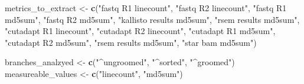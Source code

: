 \documentclass[]{article}
\newenvironment{Shaded}{\begin{snugshade}}{\end{snugshade}}
\newcommand{\KeywordTok}[1]{\textcolor[rgb]{0.13,0.29,0.53}{\textbf{#1}}}
\newcommand{\NormalTok}[1]{#1}
\newcommand{\StringTok}[1]{\textcolor[rgb]{0.31,0.60,0.02}{#1}}
\begin{document}
\begin{Shaded}
\begin{Highlighting}[]
\NormalTok{metrics_to_extract <-}\StringTok{ }\KeywordTok{c}\NormalTok{(}\StringTok{"fastq R1 linecount"}\NormalTok{, }
  \StringTok{"fastq R2 linecount"}\NormalTok{,}
  \StringTok{"fastq R1 md5sum"}\NormalTok{, }
  \StringTok{"fastq R2 md5sum"}\NormalTok{, }
  \StringTok{"kallisto results md5sum"}\NormalTok{,}
  \StringTok{"rsem results md5sum"}\NormalTok{,}
  \StringTok{"cutadapt R1 linecount"}\NormalTok{,}
  \StringTok{"cutadapt R2 linecount"}\NormalTok{,}
  \StringTok{"cutadapt R1 md5sum"}\NormalTok{,}
  \StringTok{"cutadapt R2 md5sum"}\NormalTok{,}
  \StringTok{"rsem results md5sum"}\NormalTok{,}
  \StringTok{"star bam md5sum"}\NormalTok{)}

\NormalTok{branches_analzyed <-}\StringTok{  }\KeywordTok{c}\NormalTok{(}\StringTok{"^ungroomed"}\NormalTok{, }\StringTok{"^sorted"}\NormalTok{, }\StringTok{"^groomed"}\NormalTok{)}
\NormalTok{measureable_values <-}\StringTok{ }\KeywordTok{c}\NormalTok{(}\StringTok{"linecount"}\NormalTok{, }\StringTok{"md5sum"}\NormalTok{)}
\end{Highlighting}
\end{Shaded}
\end{document}
